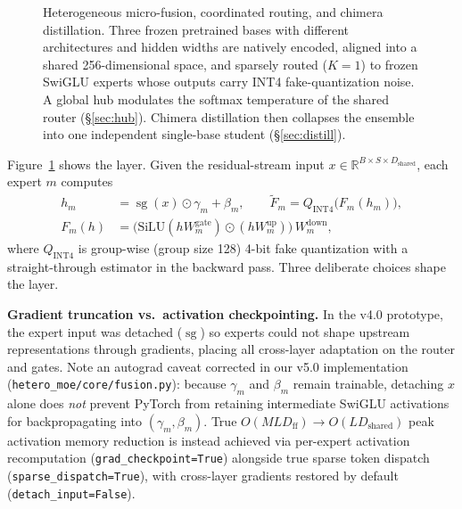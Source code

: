 \documentclass[10pt,twoside]{article}
\newcommand{\stopgrad}{\operatorname{sg}}
\newcommand{\R}{\mathbb{R}}
\theoremstyle{definition}
\theoremstyle{plain}
\theoremstyle{remark}
\begin{document}
\begin{figure}[htbp]
{}%
\caption{Heterogeneous micro-fusion, coordinated routing, and chimera distillation. Three frozen pretrained bases with different architectures and hidden widths are natively encoded, aligned into a shared 256-dimensional space, and sparsely routed ($K{=}1$) to frozen SwiGLU experts whose outputs carry INT4 fake-quantization noise. A global hub modulates the softmax temperature of the shared router (\S\ref{sec:hub}). Chimera distillation then collapses the ensemble into one independent single-base student (\S\ref{sec:distill}).}
\label{fig:overview}
\end{figure}

Figure~\ref{fig:overview} shows the layer. Given the residual-stream input $x \in \R^{B \times S \times D_{\text{shared}}}$, each expert $m$ computes
\begin{align}
\label{eq:expert}
h_m &= \stopgrad(x) \odot \gamma_m + \beta_m, \qquad
\tilde F_m = Q_{\text{INT4}}\big(F_m(h_m)\big), \\
F_m(h) &= \big(\mathrm{SiLU}(h W^{\text{gate}}_m) \odot (h W^{\text{up}}_m)\big)\, W^{\text{down}}_m,
\end{align}
where $Q_{\text{INT4}}$ is group-wise (group size 128) 4-bit fake quantization with a straight-through estimator in the backward pass. Three deliberate choices shape the layer.

\textbf{Gradient truncation vs.\ activation checkpointing.} In the v4.0 prototype, the expert input was detached ($\stopgrad$) so experts could not shape upstream representations through gradients, placing all cross-layer adaptation on the router and gates. Note an autograd caveat corrected in our v5.0 implementation (\texttt{hetero\_moe/core/fusion.py}): because $\gamma_m$ and $\beta_m$ remain trainable, detaching $x$ alone does \emph{not} prevent PyTorch from retaining intermediate SwiGLU activations for backpropagating into $(\gamma_m, \beta_m)$. True $O(M L D_{\text{ff}}) \to O(L D_{\text{shared}})$ peak activation memory reduction is instead achieved via per-expert activation recomputation (\texttt{grad\_checkpoint=True}) alongside true sparse token dispatch (\texttt{sparse\_dispatch=True}), with cross-layer gradients restored by default (\texttt{detach\_input=False}).
\end{document}
